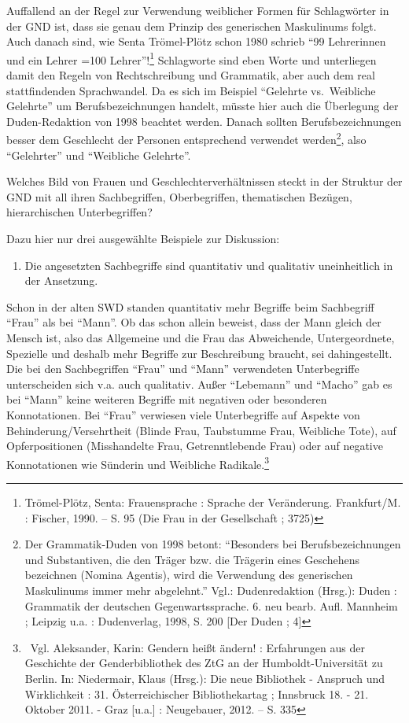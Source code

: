 \documentclass[a4paper,
fontsize=11pt,
oneside,
numbers=noperiodatend,
parskip=half-,
bibliography=totoc,
final
]{scrartcl}
\begin{document}
Auffallend an der Regel zur Verwendung weiblicher Formen für
Schlagwörter in der GND ist, dass sie genau dem Prinzip des generischen
Maskulinums folgt. Auch danach sind, wie Senta Trömel-Plötz schon 1980
schrieb \enquote{99 Lehrerinnen und ein Lehrer =100 Lehrer}!\footnote{Trömel-Plötz,
  Senta: Frauensprache : Sprache der Veränderung. Frankfurt/M. :
  Fischer, 1990. -- S. 95 (Die Frau in der Gesellschaft ; 3725)}
Schlagworte sind eben Worte und unterliegen damit den Regeln von
Rechtschreibung und Grammatik, aber auch dem real stattfindenden
Sprachwandel. Da es sich im Beispiel \enquote{Gelehrte vs.~Weibliche
Gelehrte} um Berufsbezeichnungen handelt, müsste hier auch die
Überlegung der Duden-Redaktion von 1998 beachtet werden. Danach sollten
Berufsbezeichnungen besser dem Geschlecht der Personen entsprechend
verwendet werden\footnote{Der Grammatik-Duden von 1998 betont:
  \enquote{Besonders bei Berufsbezeichnungen und Substantiven, die den
  Träger bzw. die Trägerin eines Geschehens bezeichnen (Nomina Agentis),
  wird die Verwendung des generischen Maskulinums immer mehr abgelehnt.}
  Vgl.: Dudenredaktion (Hrsg.): Duden : Grammatik der deutschen
  Gegenwartssprache. 6. neu bearb. Aufl. Mannheim ; Leipzig u.a. :
  Dudenverlag, 1998, S. 200 {[}Der Duden ; 4{]}}, also
\enquote{Gelehrter} und \enquote{Weibliche Gelehrte}.

Welches Bild von Frauen und Geschlechterverhältnissen steckt in der
Struktur der GND mit all ihren Sachbegriffen, Oberbegriffen,
thematischen Bezügen, hierarchischen Unterbegriffen?

Dazu hier nur drei ausgewählte Beispiele zur Diskussion:

\begin{enumerate}
\def\labelenumi{\arabic{enumi}.}
\itemsep1pt\parskip0pt
\item
  Die angesetzten Sachbegriffe sind quantitativ und qualitativ
  uneinheitlich in der Ansetzung.
\end{enumerate}

Schon in der alten SWD standen quantitativ mehr Begriffe beim
Sachbegriff \enquote{Frau} als bei \enquote{Mann}. Ob das schon allein
beweist, dass der Mann gleich der Mensch ist, also das Allgemeine und
die Frau das Abweichende, Untergeordnete, Spezielle und deshalb mehr
Begriffe zur Beschreibung braucht, sei dahingestellt. Die bei den
Sachbegriffen \enquote{Frau} und \enquote{Mann} verwendeten
Unterbegriffe unterscheiden sich v.a. auch qualitativ. Außer
\enquote{Lebemann} und \enquote{Macho} gab es bei \enquote{Mann} keine
weiteren Begriffe mit negativen oder besonderen Konnotationen. Bei
\enquote{Frau} verwiesen viele Unterbegriffe auf Aspekte von
Behinderung/Versehrtheit (Blinde Frau, Taubstumme Frau, Weibliche Tote),
auf Opferpositionen (Misshandelte Frau, Getrenntlebende Frau) oder auf
negative Konnotationen wie Sünderin und Weibliche Radikale.\footnote{~Vgl.
  Aleksander, Karin: Gendern heißt ändern! : Erfahrungen aus der
  Geschichte der Genderbibliothek des ZtG an der Humboldt-Universität zu
  Berlin. In: Niedermair, Klaus (Hrsg.): Die neue Bibliothek - Anspruch
  und Wirklichkeit : 31. Österreichischer Bibliothekartag ; Innsbruck
  18. - 21. Oktober 2011. - Graz {[}u.a.{]} : Neugebauer, 2012. -- S.
  335}
\end{document}
